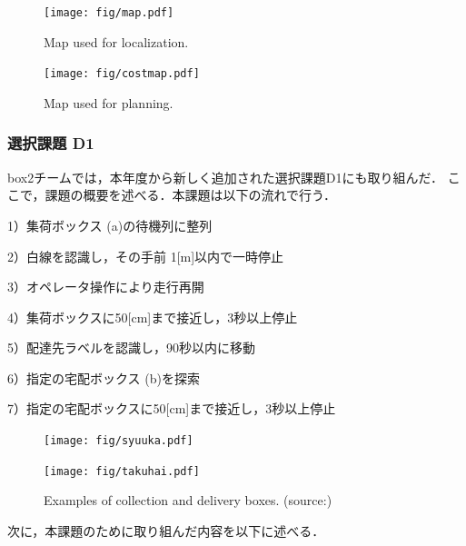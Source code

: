 \documentclass[twocolumn, 9pt]{jsproceedings}
\begin{document}
\begin{figure}[h!]
  \centering
  \texttt{[image: fig/map.pdf]}
  \caption{Map used for localization.}
  \label{fig:map}
\end{figure}
\vspace*{-2mm}
\begin{figure}[h!]
  \centering
  \texttt{[image: fig/costmap.pdf]}
  \caption{Map used for planning.}
  \label{fig:costmap}
\end{figure}


\subsubsection{選択課題 D1}
box2チームでは，本年度から新しく追加された選択課題D1にも取り組んだ．
ここで，課題の概要を述べる．本課題は以下の流れで行う．

\vspace*{1mm}

1）集荷ボックス (a)の待機列に整列

2）白線を認識し，その手前 1[m]以内で一時停止

3）オペレータ操作により走行再開

4）集荷ボックスに50[cm]まで接近し，3秒以上停止

5）配達先ラベルを認識し，90秒以内に移動

6）指定の宅配ボックス (b)を探索

7）指定の宅配ボックスに50[cm]まで接近し，3秒以上停止
\begin{figure}[h!]
  \begin{minipage}[t]{0.47\linewidth}
    \centering
    \texttt{[image: fig/syuuka.pdf]}
    \caption*{\hspace*{3mm}(a) Collection box}
  \end{minipage}
  \hspace*{2mm}
  \begin{minipage}[t]{0.47\linewidth}
    \centering
    \texttt{[image: fig/takuhai.pdf]}
    \caption*{(b) Delivery box}
  \end{minipage}
  \caption{Examples of collection and delivery boxes. (source:\cite{tukuba})}
  \label{fig:hako}
\end{figure}\vspace*{-2mm}
次に，本課題のために取り組んだ内容を以下に述べる．
\end{document}
